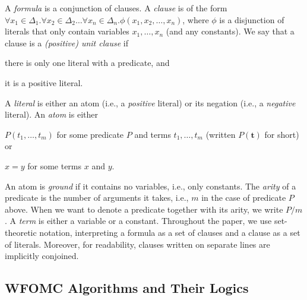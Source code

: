 \documentclass{article}
\theoremstyle{definition}
\theoremstyle{remark}
\begin{document}
A \emph{formula} is a conjunction of clauses. A \emph{clause} is of the form
$\forall x_{1} \in \Delta_{1}\text{.}\forall x_{2} \in \Delta_{2}\dots\text{
}\forall x_{n} \in \Delta_{n}\text{.}\phi(x_{1}, x_{2}, \dots, x_{n})$, where
$\phi$ is a disjunction of literals that only contain variables
$x_{1}, \dots, x_{n}$ (and any constants). We say that a clause is a
\emph{(positive) unit clause} if
\begin{enumerate*}[label=(\roman*)]
  \item there is only one literal with a predicate, and
  \item it is a positive literal.
\end{enumerate*}
A \emph{literal} is either an atom (i.e., a \emph{positive} literal) or its
negation (i.e., a \emph{negative} literal). An \emph{atom} is either
\begin{enumerate*}[label=(\roman*)]
  \item $P(t_{1}, \dots, t_{m})$ for some predicate $P$ and terms
  $t_{1}, \dots, t_{m}$ (written $P(\mathbf{t})$ for short) or
  \item $x=y$ for some terms $x$ and $y$.
\end{enumerate*}
An atom is \emph{ground} if it contains no variables, i.e., only constants. The
\emph{arity} of a predicate is the number of arguments it takes, i.e., $m$ in
the case of predicate $P$ above. When we want to denote a predicate together
with its arity, we write $P/m$. A \emph{term} is either a variable or a
constant. Throughout the paper, we use set-theoretic notation, interpreting a
formula as a set of clauses and a clause as a set of literals. Moreover, for
readability, clauses written on separate lines are implicitly conjoined.

\subsection{WFOMC Algorithms and Their Logics}\label{sec:threelogics}
\end{document}

